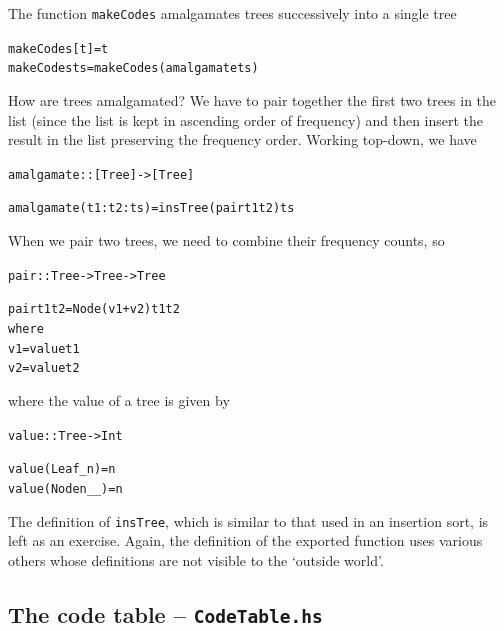 The function \texttt{makeCodes} amalgamates trees successively into a single
tree
\begin{alltt}
makeCodes [t] = t
makeCodes ts  = makeCodes (amalgamate ts)
\end{alltt}
How are trees amalgamated? We have to pair together the first two trees in
the list (since the list is kept in ascending order of frequency) and then
insert the result in the list preserving the frequency order. Working top-down, we have 
\begin{alltt}
amalgamate :: [ Tree ] -> [ Tree ]

amalgamate (t1:t2:ts) = insTree (pair t1 t2) ts
\end{alltt}
When we pair two trees, we need to combine their frequency counts, so
\begin{alltt}
pair :: Tree -> Tree -> Tree

pair t1 t2 = Node (v1+v2) t1 t2
             where
             v1 = value t1
             v2 = value t2
\end{alltt}
where the value of a tree is given by
\begin{alltt}
value :: Tree -> Int

value (Leaf _ n)   = n
value (Node n _ _) = n
\end{alltt}
The definition of \texttt{insTree}, which is similar to that used in an insertion
sort, is left as an exercise. Again, the definition of the exported function
uses various others whose definitions are not visible to the `outside world'.

\subsection*{The code table -- \texttt{CodeTable.hs}}

